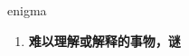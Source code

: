 
\begin{frame}
{\huge enigma}
\begin{center}
\begin{enumerate}\Large
  \item \textbf{难以理解或解释的事物，谜}
\end{enumerate}
\end{center}
\end{frame}
